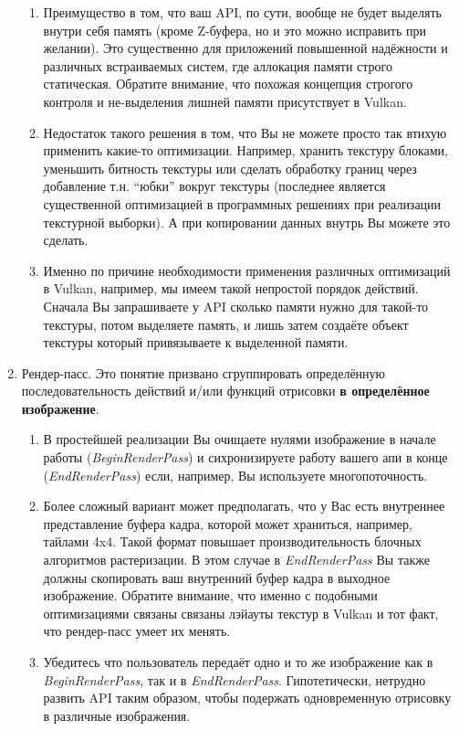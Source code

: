 \documentclass[12pt,subf,href,colorlinks=true]{article}
\begin{document}
\begin{enumerate}
\begin{enumerate}
	\item Преимущество в том, что ваш API, по сути, вообще не будет выделять внутри себя память (кроме Z-буфера, но и это можно исправить при желании). Это существенно для приложений повышенной надёжности и различных встраиваемых систем, где аллокация памяти строго статическая. Обратите внимание, что похожая концепция строгого контроля и не-выделения лишней памяти присутствует в Vulkan.
	 
	\item Недостаток такого решения в том, что Вы не можете просто так втихую применить какие-то оптимизации. Например, хранить текстуру блоками, уменьшить битность текстуры или сделать обработку границ через добавление т.н. ``юбки'' вокруг текстуры (последнее является существенной оптимизацией в программных решениях при реализации текстурной выборки). А при копировании данных внутрь Вы можете это сделать.
	
	\item Именно по причине необходимости применения различных оптимизаций в Vulkan, например, мы имеем такой непростой порядок действий. Сначала Вы запрашиваете у API сколько памяти нужно для такой-то текстуры, потом выделяете память, и лишь затем создаёте объект текстуры который привязываете к выделенной памяти.
\end{enumerate}

\item Рендер-пасс. Это понятие призвано сгруппировать определённую последовательность действий и/или функций отрисовки \textbf{в определённое изображение}.

\begin{enumerate}
	\item В простейшей реализации Вы очищаете нулями изображение в начале работы (\textit{BeginRenderPass}) и сихронизируете работу вашего апи в конце (\textit{EndRenderPass}) если, например, Вы используете многопоточность.
	
	\item Более сложный вариант может предполагать, что у Вас есть внутреннее представление буфера кадра, которой может храниться, например, тайлами 4x4. Такой формат повышает производительность блочных алгоритмов растеризации. В этом случае в \textit{EndRenderPass} Вы также должны скопировать ваш внутренний буфер кадра в выходное изображение. Обратите внимание, что именно с подобными оптимизациями связаны связаны лэйауты текстур в Vulkan и тот факт, что рендер-пасс умеет их менять.
	
	\item Убедитесь что пользователь передаёт одно и то же изображение как в \textit{BeginRenderPass}, так и в \textit{EndRenderPass}. Гипотетически, нетрудно развить API таким образом, чтобы подержать одновременную отрисовку в различные изображения.
\end{enumerate}


\end{enumerate}
\end{document}
